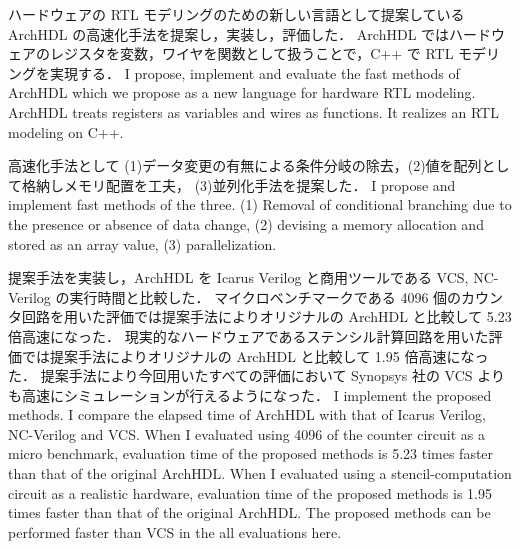 ハードウェアの RTL モデリングのための新しい言語として提案している ArchHDL の高速化手法を提案し，実装し，評価した．
ArchHDL ではハードウェアのレジスタを変数，ワイヤを関数として扱うことで，C++ で RTL モデリングを実現する．
\fi
I propose, implement and evaluate the fast methods of ArchHDL which we propose as a new language for hardware RTL modeling.
ArchHDL treats registers as variables and wires as functions.
It realizes an RTL modeling on C++.

高速化手法として (1)データ変更の有無による条件分岐の除去，(2)値を配列として格納しメモリ配置を工夫，
(3)並列化手法を提案した．
\fi
I propose and implement fast methods of the three.
(1) Removal of conditional branching due to the presence or absence of data change,
(2) devising a memory allocation and stored as an array value,
(3) parallelization.

提案手法を実装し，ArchHDL を Icarus Verilog と商用ツールである VCS, NC-Verilog の実行時間と比較した．
マイクロベンチマークである 4096 個のカウンタ回路を用いた評価では提案手法によりオリジナルの ArchHDL と比較して 5.23 倍高速になった．
現実的なハードウェアであるステンシル計算回路を用いた評価では提案手法によりオリジナルの ArchHDL と比較して 1.95 倍高速になった．
提案手法により今回用いたすべての評価において Synopsys 社の VCS よりも高速にシミュレーションが行えるようになった．
\fi
I implement the proposed methods. I compare the elapsed time of ArchHDL with that of Icarus Verilog, NC-Verilog and VCS.
When I evaluated using 4096 of the counter circuit as a micro benchmark,
evaluation time of the proposed methods is 5.23 times faster than that of the original ArchHDL.
When I evaluated using a stencil-computation circuit as a realistic hardware,
evaluation time of the proposed methods is 1.95 times faster than that of the original ArchHDL.
The proposed methods can be performed faster than VCS in the all evaluations here.